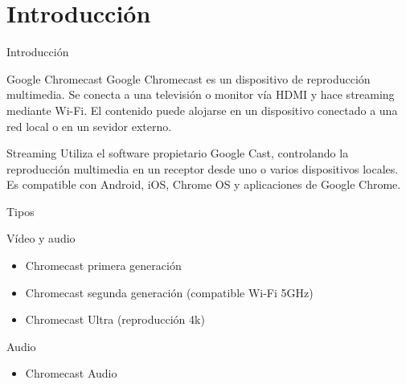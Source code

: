 \section{Introducción}

\begin{frame}{Introducción}
	\begin{block}{Google Chromecast}
	Google Chromecast es un dispositivo de reproducción multimedia. Se conecta a una televisión o monitor vía HDMI y hace streaming mediante Wi-Fi.
	El contenido puede alojarse en un dispositivo conectado a una red local o en un sevidor externo.
	\end{block}
	
	\begin{block}{Streaming}
	Utiliza el software propietario Google Cast, controlando la reproducción multimedia en un receptor desde uno o varios dispositivos locales.
	Es compatible con Android, iOS, Chrome OS y aplicaciones de
	Google Chrome.
	\end{block}
\end{frame}


\begin{frame}{Tipos}
	\begin{exampleblock}{Vídeo y audio}
		\begin{itemize}
			\item Chromecast primera generación
			\item Chromecast segunda generación (compatible Wi-Fi 5GHz)
			\item Chromecast Ultra (reproducción 4k)
		\end{itemize}
	\end{exampleblock}
	
	\begin{exampleblock}{Audio}
		\begin{itemize}
			\item  Chromecast Audio
		\end{itemize}
	\end{exampleblock}
\end{frame}


